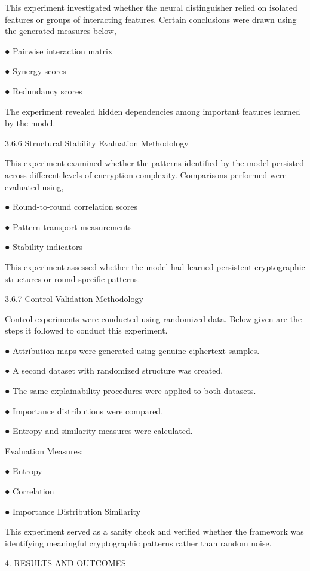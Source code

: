This experiment investigated whether the neural distinguisher relied on isolated features or 
groups of interacting features. Certain conclusions were drawn using the generated measures 
below, 

●  Pairwise interaction matrix 

●  Synergy scores 

●  Redundancy scores 

The experiment revealed hidden dependencies among important features learned by the model. 

3.6.6 Structural Stability Evaluation Methodology 

This experiment examined whether the patterns identified by the model persisted across different 
levels of encryption complexity. Comparisons performed were evaluated using, 

●  Round-to-round correlation scores 

●  Pattern transport measurements 

●  Stability indicators 

This experiment assessed whether the model had learned persistent cryptographic structures or 
round-specific patterns. 

 
 

3.6.7 Control Validation Methodology 

Control experiments were conducted using randomized data. Below given are the steps it 
followed to conduct this experiment. 

●  Attribution maps were generated using genuine ciphertext samples. 

●  A second dataset with randomized structure was created. 

●  The same explainability procedures were applied to both datasets. 

●  Importance distributions were compared. 

●  Entropy and similarity measures were calculated. 

Evaluation Measures: 

●  Entropy 

●  Correlation 

●  Importance Distribution Similarity 

This experiment served as a sanity check and verified whether the framework was identifying 
meaningful cryptographic patterns rather than random noise. 

4. RESULTS AND OUTCOMES 
